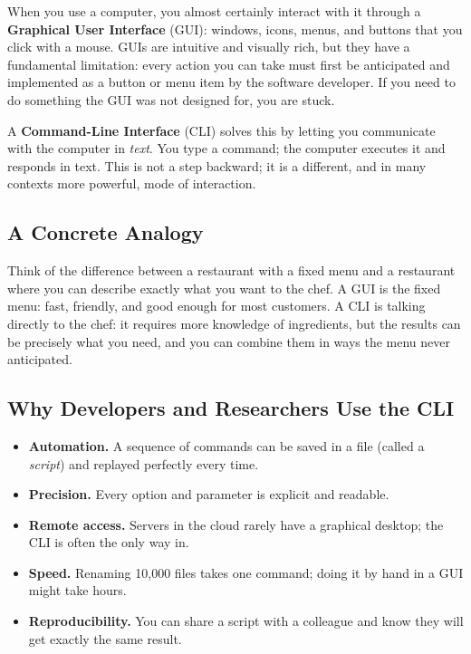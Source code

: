 When you use a computer, you almost certainly interact with it through a
\textbf{Graphical User Interface} (GUI): windows, icons, menus, and
buttons that you click with a mouse. GUIs are intuitive and visually rich,
but they have a fundamental limitation: every action you can take must first
be anticipated and implemented as a button or menu item by the software
developer. If you need to do something the GUI was not designed for, you are
stuck.

A \textbf{Command-Line Interface} (CLI) solves this by letting you
communicate with the computer in \emph{text}. You type a command; the
computer executes it and responds in text. This is not a step backward; it
is a different, and in many contexts more powerful, mode of interaction.

\subsection{A Concrete Analogy}

Think of the difference between a restaurant with a fixed menu and a
restaurant where you can describe exactly what you want to the chef. A GUI
is the fixed menu: fast, friendly, and good enough for most customers. A CLI
is talking directly to the chef: it requires more knowledge of ingredients,
but the results can be precisely what you need, and you can combine them in
ways the menu never anticipated.

\subsection{Why Developers and Researchers Use the CLI}

\begin{itemize}
  \item \textbf{Automation.} A sequence of commands can be saved in a file
        (called a \emph{script}) and replayed perfectly every time.
  \item \textbf{Precision.} Every option and parameter is explicit and
        readable.
  \item \textbf{Remote access.} Servers in the cloud rarely have a graphical
        desktop; the CLI is often the only way in.
  \item \textbf{Speed.} Renaming 10{,}000 files takes one command; doing it
        by hand in a GUI might take hours.
  \item \textbf{Reproducibility.} You can share a script with a colleague
        and know they will get exactly the same result.
\end{itemize}

